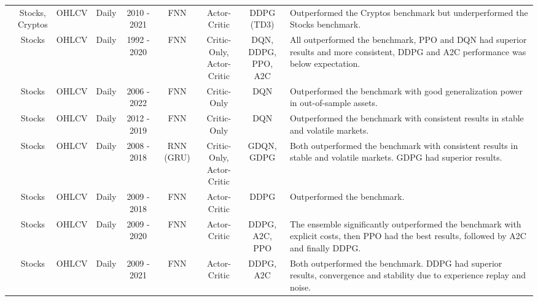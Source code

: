 \begin{table}
\begin{tabularx}{\linewidth}{@{}ccccccccX@{}}
\cite{majidi_algorithmic_2022} & \makecell{Stocks, \\ Cryptos} & OHLCV & Daily & 2010 - 2021 & FNN & Actor-Critic & DDPG (TD3) & Outperformed the Cryptos benchmark but underperformed the Stocks benchmark. \\

\cite{sagiraju_application_2021} & Stocks & OHLCV & Daily & 1992 - 2020 & FNN & \makecell{Critic-Only, \\ Actor-Critic} & \makecell{DQN, DDPG, \\ PPO, A2C} & All outperformed the benchmark, PPO and DQN had superior results and more consistent, DDPG and A2C performance was below expectation. \\

\cite{sim_generalized_2023} & Stocks & OHLCV & Daily & 2006 - 2022 & FNN & Critic-Only & DQN & Outperformed the benchmark with good generalization power in out-of-sample assets. \\

\cite{theate_application_2021} & Stocks & OHLCV & Daily & 2012 - 2019 & FNN & Critic-Only & DQN & Outperformed the benchmark with consistent results in stable and volatile markets. \\

\cite{wu_adaptive_2020} & Stocks & OHLCV & Daily & 2008 - 2018 & RNN (GRU) & \makecell{Critic-Only, \\ Actor-Critic} & \makecell{GDQN, \\ GDPG} & Both outperformed the benchmark with consistent results in stable and volatile markets. GDPG had superior results. \\
 
\cite{xiong_practical_2018} & Stocks & OHLCV & Daily & 2009 - 2018 & FNN & Actor-Critic & DDPG & Outperformed the benchmark. \\

\cite{yang_deep_2020} & Stocks & OHLCV & Daily & 2009 - 2020 & FNN & Actor-Critic & \makecell{DDPG, \\ A2C, PPO} & The ensemble significantly outperformed the benchmark with explicit costs, then PPO had the best results, followed by A2C and finally DDPG. \\

\cite{yousefi_deep_2022} & Stocks & OHLCV & Daily & 2009 - 2021 & FNN & Actor-Critic & DDPG, A2C & Both outperformed the benchmark. DDPG had superior results, convergence and stability due to experience replay and noise. \\


\end{tabularx}
\end{table}
